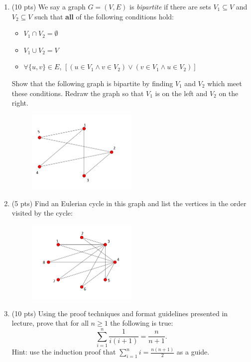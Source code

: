 \documentclass[14pt]{extarticle}
\begin{document}
\begin{enumerate}
\item (10 pts) We say a graph $G = (V, E)$ is \textit{bipartite} if there are sets $V_1 \subseteq V$ and $V_2 \subseteq V$ such that \textbf{all} of the following conditions hold:
\begin{itemize}
\item $V_1 \cap V_2 = \emptyset$
\item $V_1 \cup V_2 = V$
\item $\forall \{u, v\} \in E$, $\left[(u \in V_1 \land v \in V_2) \lor (v \in V_1 \land u \in V_2)\right]$
\end{itemize}
Show that the following graph is bipartite by finding $V_1$ and $V_2$ which meet these conditions. Redraw the graph so that $V_1$ is on the left and $V_2$ on the right.
\begin{figure}[H]
	\centering
  \includegraphics[width=0.5\textwidth]{figure_2.png}
\end{figure}

\item (5 pts) Find an Eulerian cycle in this graph and list the vertices in the order visited by the cycle:
\begin{figure}[H]
	\centering
  \includegraphics[width=0.5\textwidth]{figure_1.png}
\end{figure}

\item (10 pts) Using the proof techniques and format guidelines presented in lecture, prove that for all $n \geq 1$ the following is true:
\[
\sum_{i=1}^{n} \frac{1}{i(i+1)} = \frac{n}{n+1}.
\]
Hint: use the induction proof that $\sum_{i=1}^{n} i = \frac{n(n+1)}{2}$ as a guide.

\end{enumerate}
\end{document}
